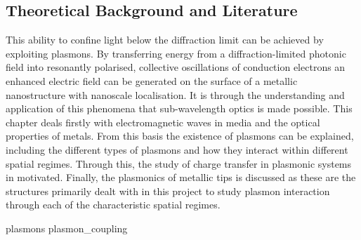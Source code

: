 \documentclass[12pt, a4paper, oneside]{book}
\begin{document}
\begin{singlespace}
{\color{white}
\chapter{Theoretical Background and Literature}}
\label{ch:theory}
\end{singlespace}


This ability to confine light below the diffraction limit can be achieved by exploiting plasmons. By transferring energy from a diffraction-limited photonic field into resonantly polarised, collective oscillations of conduction electrons an enhanced electric field can be generated on the surface of a metallic nanostructure with nanoscale localisation. It is through the understanding and application of this phenomena that sub-wavelength optics is made possible.
This chapter deals firstly with electromagnetic waves in media and the optical properties of metals. From this basis the existence of plasmons can be explained, including the different types of plasmons and how they interact within different spatial regimes. Through this, the study of charge transfer in plasmonic systems in motivated. Finally, the plasmonics of metallic tips is discussed as these are the structures primarily dealt with in this project to study plasmon interaction through each of the characteristic spatial regimes.

{plasmons}
{plasmon_coupling}
\end{document}
